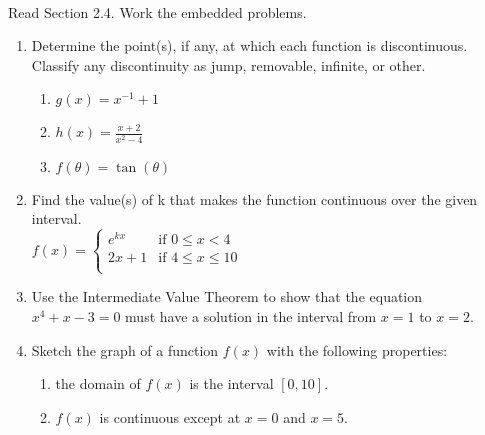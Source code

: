 \documentclass[11pt,fleqn]{article}
\begin{document}
\renewcommand{\headrulewidth}{0pt}
\newcommand{\blank}[1]{\rule{#1}{0.75pt}}
\newcommand{\bc}{\begin{center}}
\newcommand{\ec}{\end{center}}
\renewcommand{\d}{\displaystyle}

\vspace*{-0.7in}

\begin{center}
  \large
  \\
\end{center}
Read Section 2.4. Work the embedded problems. \\
\hrulefill

\begin{enumerate}
\item Determine the point(s), if any, at which each function is discontinuous. Classify any discontinuity as jump, removable, infinite, or other.
\begin{enumerate}
	\item $g(x) = x^{-1}+1$
	\vfill
	\item $h(x)=\frac{x+2}{x^2-4}$
	\vfill
	\item $f(\theta)=\tan (\theta)$
	\vfill
	\end{enumerate}
\item Find the value(s) of k that makes the function continuous over the given interval.\\
$f(x)=\begin{cases} e^{kx} & \text{if } 0 \leq x < 4 \\
				2x+1 & \text{if } 4 \leq x \leq 10 \\
				\end{cases}$
\vspace{2in}
\newpage
\item Use the Intermediate Value Theorem to show that the equation $x^4+x-3=0$ must have a solution in
the interval from $x=1$ to $x=2.$
\vfill
\item Sketch the graph of a function $f(x)$ with the following properties:\\
\begin{enumerate}
\item the domain of $f(x)$ is the interval $[0,10].$
\item $f(x)$ is continuous except at $x=0$ and $x=5.$
\end{enumerate}
\vfill
\end{enumerate}
\end{document}
